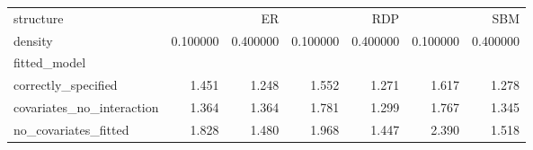 \begin{tabular}{lrrrrrr}
\toprule
structure & \multicolumn{2}{r}{ER} & \multicolumn{2}{r}{RDP} & \multicolumn{2}{r}{SBM} \\
density & 0.100000 & 0.400000 & 0.100000 & 0.400000 & 0.100000 & 0.400000 \\
fitted_model &  &  &  &  &  &  \\
\midrule
correctly_specified & 1.451 & 1.248 & 1.552 & 1.271 & 1.617 & 1.278 \\
covariates_no_interaction & 1.364 & 1.364 & 1.781 & 1.299 & 1.767 & 1.345 \\
no_covariates_fitted & 1.828 & 1.480 & 1.968 & 1.447 & 2.390 & 1.518 \\
\bottomrule
\end{tabular}
